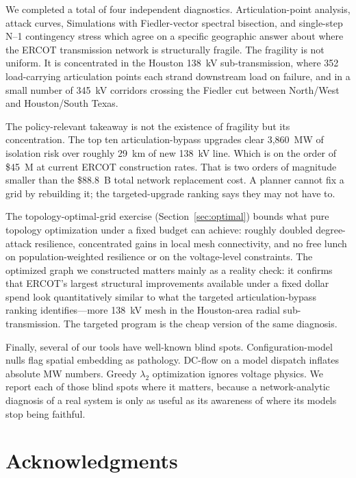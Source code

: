 \documentclass[12pt,letterpaper]{article}
\begin{document}
We completed a total of four independent diagnostics. Articulation-point analysis, attack curves, Simulations with Fiedler-vector spectral bisection, and single-step N--1 contingency stress which agree on a specific geographic answer about where the ERCOT transmission network is structurally fragile. The fragility is not uniform. It is concentrated in the Houston 138~kV sub-transmission, where 352 load-carrying articulation points each strand downstream load on failure, and in a small number of 345~kV corridors crossing the Fiedler cut between North/West and Houston/South Texas.

The policy-relevant takeaway is not the existence of fragility but its concentration. The top ten articulation-bypass upgrades clear 3{,}860~MW of isolation risk over roughly 29~km of new 138~kV line. Which is on the order of \$45~M at current ERCOT construction rates. That is two orders of magnitude smaller than the \$88.8~B total network replacement cost. A planner cannot fix a grid by rebuilding it; the targeted-upgrade ranking says they may not have to.

The topology-optimal-grid exercise (Section~\ref{sec:optimal}) bounds what pure topology optimization under a fixed budget can achieve: roughly doubled degree-attack resilience, concentrated gains in local mesh connectivity, and no free lunch on population-weighted resilience or on the voltage-level constraints. The optimized graph we constructed matters mainly as a reality check: it confirms that ERCOT's largest structural improvements available under a fixed dollar spend look quantitatively similar to what the targeted articulation-bypass ranking identifies---more 138~kV mesh in the Houston-area radial sub-transmission. The targeted program is the cheap version of the same diagnosis.

Finally, several of our tools have well-known blind spots. Configuration-model nulls flag spatial embedding as pathology. DC-flow on a model dispatch inflates absolute MW numbers. Greedy $\lambda_2$ optimization ignores voltage physics. We report each of those blind spots where it matters, because a network-analytic diagnosis of a real system is only as useful as its awareness of where its models stop being faithful.

\section*{Acknowledgments}
\end{document}
